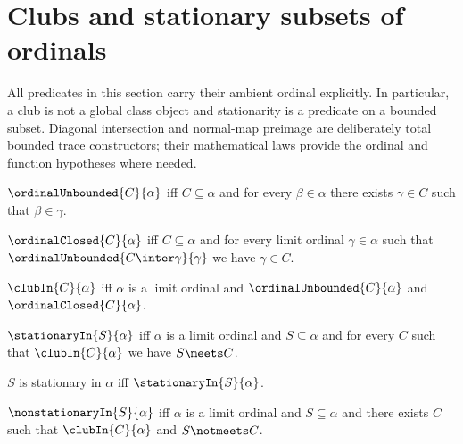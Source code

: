 \section{Clubs and stationary subsets of ordinals}





All predicates in this section carry their ambient ordinal explicitly.  In
particular, a club is not a global class object and stationarity is a
predicate on a bounded subset. Diagonal intersection and normal-map preimage
are deliberately total bounded trace constructors; their mathematical laws
provide the ordinal and function hypotheses where needed.

\begin{definition}\label{ordinal_unbounded}
    $\ordinalUnbounded{C}{\alpha}$ iff $C\subseteq\alpha$ and
        for every $\beta\in\alpha$ there exists $\gamma\in C$ such that
            $\beta\in\gamma$.
\end{definition}

\begin{definition}\label{ordinal_closed}
    $\ordinalClosed{C}{\alpha}$ iff $C\subseteq\alpha$ and
        for every limit ordinal $\gamma\in\alpha$ such that
            $\ordinalUnbounded{C\inter\gamma}{\gamma}$
        we have $\gamma\in C$.
\end{definition}

\begin{definition}\label{club_in}
    $\clubIn{C}{\alpha}$ iff $\alpha$ is a limit ordinal and
        $\ordinalUnbounded{C}{\alpha}$ and $\ordinalClosed{C}{\alpha}$.
\end{definition}

\begin{definition}\label{stationary_in}
    $\stationaryIn{S}{\alpha}$ iff $\alpha$ is a limit ordinal and
        $S\subseteq\alpha$ and for every $C$ such that $\clubIn{C}{\alpha}$
            we have $S\meets C$.
\end{definition}

\begin{abbreviation}\label{stationary_in_phrase}
    $S$ is stationary in $\alpha$ iff $\stationaryIn{S}{\alpha}$.
\end{abbreviation}

\begin{definition}\label{nonstationary_in}
    $\nonstationaryIn{S}{\alpha}$ iff $\alpha$ is a limit ordinal and
        $S\subseteq\alpha$ and there exists $C$ such that
            $\clubIn{C}{\alpha}$ and $S\notmeets C$.
\end{definition}

